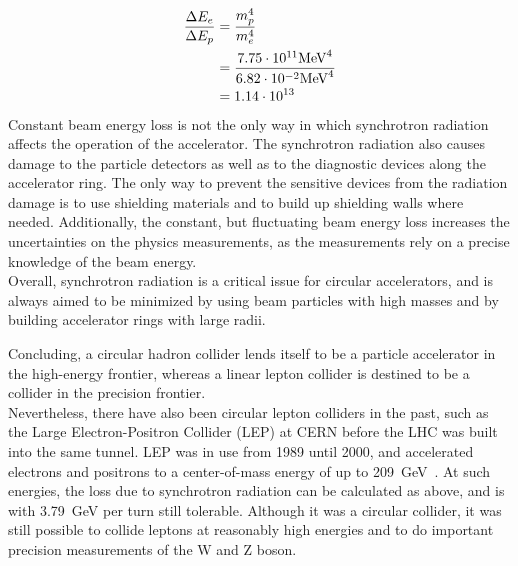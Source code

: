 \begin{align*}
 \frac{\Delta E_e}{\Delta E_p} &=\frac{m_p^4}{m_e^4}\\
 &= \frac{7.75\cdot10^{11} \textnormal{MeV}^4}{6.82\cdot10^{-2} \textnormal{MeV}^4}\\
 &=1.14\cdot10^{13}
\end{align*}
Constant beam energy loss is not the only way in which synchrotron radiation affects the operation of the accelerator.
The synchrotron radiation also causes damage to the particle detectors as well as to the diagnostic devices along the accelerator ring.
The only way to prevent the sensitive devices from the radiation damage is to use shielding materials and to build up shielding walls where needed.
Additionally, the constant, but fluctuating beam energy loss increases the uncertainties on the physics measurements, as the measurements rely on a precise knowledge of the beam energy.
\\
Overall, synchrotron radiation is a critical issue for circular accelerators, and is always aimed to be minimized by using beam particles with high masses and by building accelerator rings with large radii.

Concluding, a circular hadron collider lends itself to be a particle accelerator in the high-energy frontier, whereas a linear lepton collider is destined to be a collider in the precision frontier.
\\
Nevertheless, there have also been circular lepton colliders in the past, such as the Large Electron-Positron Collider (LEP) at CERN before the LHC was built into the same tunnel.
LEP was in use from 1989 until 2000, and accelerated electrons and positrons to a center-of-mass energy of up to \SI{209}{\GeV}~\cite{LEP}.
At such energies, the loss due to synchrotron radiation can be calculated as above, and is with \SI{3.79}{\GeV} per turn still tolerable.
Although it was a circular collider, it was still possible to collide leptons at reasonably high energies and to do important precision measurements of the W and Z boson.

